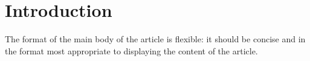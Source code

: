 \section*{Introduction}
The format of the main body of the article is flexible: it should be concise and in the format most appropriate to displaying the content of the article.
